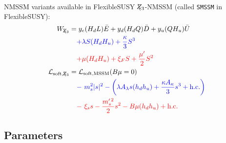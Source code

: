\documentclass[hyperref={pdfpagelabels=false},ngerman]{beamer}
\newcommand{\Lagr}{\mathcal{L}}
\newcommand{\Zv}{\ensuremath{\backslash\mkern-11.0mu{Z_3}}}
\begin{document}
\begin{frame}{NMSSM variants available in FlexibleSUSY}
  $\Zv$-NMSSM (called \texttt{SMSSM} in FlexibleSUSY):
  \begin{align*} 
    W_{\Zv} &= y_e (H_d L) \bar{E}
      + y_d (H_d Q) \bar{D}
      + y_u (Q H_u) \bar{U}\\
      &\phantom{={}}
      \textcolor{blue}{+ \lambda S (H_d H_u) + \frac{\kappa}{3}S^{3}} \\
      &\phantom{={}}
      \textcolor{red}{+ \mu(H_d H_u) + \xi_FS 
      + \frac{\mu^\prime}{2} S^{2}}\\
    \Lagr_{\text{soft},\Zv} &= \Lagr_\text{soft,MSSM}(B\mu=0)\\
    &\phantom{={}}
    \textcolor{blue}{ -\ m_s^2|s|^2 
      -\left(\lambda A_\lambda s (h_d h_u)
        + \frac{\kappa A_\kappa}{3} s^3 + \text{h.c.}\right)}\\
    &\phantom{={}}
    \textcolor{red}{ -\ \xi_s s - \frac{m_s^{\prime \, 2}}{2} s^2
    - B\mu (h_d h_u) + \text{h.c.}}
  \end{align*}
\end{frame}

\subsection{Parameters}
\end{document}
